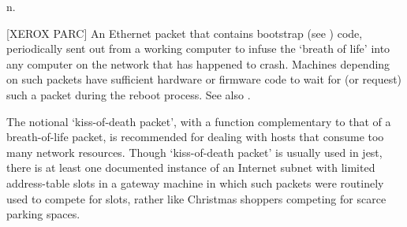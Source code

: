  n.

[XEROX PARC] An Ethernet packet that contains bootstrap (see )
code, periodically sent out from a working computer to infuse the `breath of
life' into any computer on the network that has happened to crash. Machines
depending on such packets have sufficient hardware or firmware code to wait for
(or request) such a packet during the reboot process. See also
.

The notional `kiss-of-death packet', with a function complementary to that of a
breath-of-life packet, is recommended for dealing with hosts that consume too
many network resources. Though `kiss-of-death packet' is usually used in jest,
there is at least one documented instance of an Internet subnet with limited
address-table slots in a gateway machine in which such packets were routinely
used to compete for slots, rather like Christmas shoppers competing for scarce
parking spaces.

